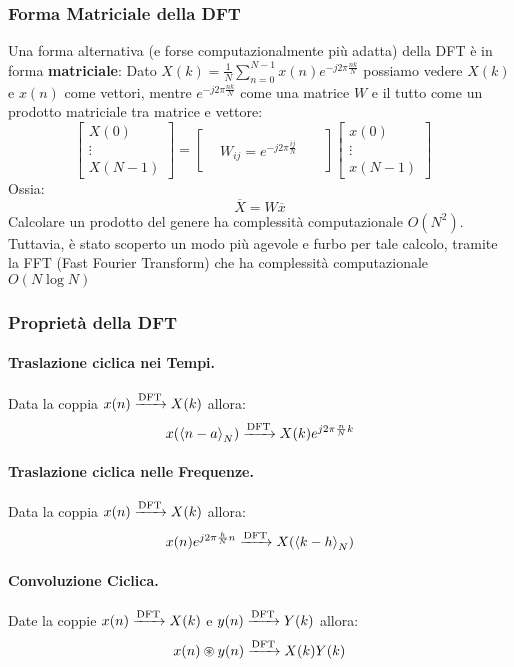 \subsubsection{Forma Matriciale della DFT}
Una forma alternativa (e forse computazionalmente più adatta) della DFT è in forma \textbf{matriciale}:
Dato $X(k) = \frac{1}{N} \sum_{n = 0}^{N - 1} x(n)e^{-j2\pi \frac{nk}{N}}$ possiamo vedere $X(k)$ e $x(n)$ come vettori, mentre $e^{-j2\pi \frac{nk}{N}}$ come una matrice $W$ e il tutto come un prodotto matriciale tra matrice e vettore:
\begin{equation}
    \begin{bmatrix}
        X(0) \\
        \vdots \\
        X(N-1)
        \end{bmatrix} = 
    \begin{bmatrix}
        & & & \\
        & W_{ij} = e^{-j2\pi \frac{ij}{N}} & \\
        & & &
        \end{bmatrix}
    \begin{bmatrix}
x(0) \\
\vdots \\
x(N-1)
\end{bmatrix}
\quad
\end{equation}
Ossia:
\begin{equation*}
    \overline{X} = W \overline{x}
\end{equation*}
Calcolare un prodotto del genere ha complessità computazionale $O(N^2)$. Tuttavia, è stato scoperto un modo più agevole e furbo
per tale calcolo, tramite la FFT (Fast Fourier Transform) che ha complessità computazionale $O(N \log N)$

\subsubsection{Proprietà della DFT}
\paragraph{Traslazione ciclica nei Tempi.}Data la coppia $x(n) \xrightarrow{\text{DFT}} X(k)$ allora:
\begin{equation}
    x(\left< n - a\right>_{N}) \xrightarrow{\text{DFT}} X(k)e^{j2\pi \frac{n}{N}k}
\end{equation}

\paragraph{Traslazione ciclica nelle Frequenze.}Data la coppia $x(n) \xrightarrow{\text{DFT}} X(k)$ allora:
\begin{equation}
    x(n)e^{j2\pi\frac{h}{N}n} \xrightarrow{\text{DFT}} X(\left< k - h\right>_{N})
\end{equation}

\paragraph{Convoluzione Ciclica.}Date la coppie $x(n) \xrightarrow{\text{DFT}} X(k)$ e $y(n) \xrightarrow{\text{DFT}} Y(k)$ allora:
\begin{equation}
    x(n) \circledast y(n) \xrightarrow{\text{DFT}} X(k)Y(k)
\end{equation}